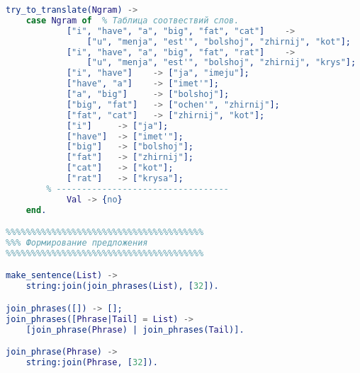 {\begin{lstlisting}[language=erlang]
try_to_translate(Ngram) ->
    case Ngram of  % Таблица соотвествий слов.
            ["i", "have", "a", "big", "fat", "cat"]    ->
                ["u", "menja", "est'", "bolshoj", "zhirnij", "kot"];
            ["i", "have", "a", "big", "fat", "rat"]    ->
                ["u", "menja", "est'", "bolshoj", "zhirnij", "krys"];
            ["i", "have"]    -> ["ja", "imeju"];
            ["have", "a"]    -> ["imet'"];
            ["a", "big"]     -> ["bolshoj"];
            ["big", "fat"]   -> ["ochen'", "zhirnij"];
            ["fat", "cat"]   -> ["zhirnij", "kot"];
            ["i"]     -> ["ja"];
            ["have"]  -> ["imet'"];
            ["big"]   -> ["bolshoj"];
            ["fat"]   -> ["zhirnij"];
            ["cat"]   -> ["kot"];
            ["rat"]   -> ["krysa"];
        % ----------------------------------
            Val -> {no}
    end.

%%%%%%%%%%%%%%%%%%%%%%%%%%%%%%%%%%%%%%%
%%% Формирование предложения
%%%%%%%%%%%%%%%%%%%%%%%%%%%%%%%%%%%%%%%

make_sentence(List) ->
    string:join(join_phrases(List), [32]).

join_phrases([]) -> [];
join_phrases([Phrase|Tail] = List) ->
    [join_phrase(Phrase) | join_phrases(Tail)].

join_phrase(Phrase) ->
    string:join(Phrase, [32]).

\end{lstlisting}
}

